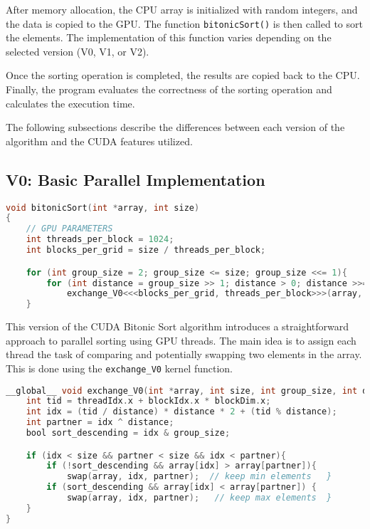 \documentclass[a4paper,12pt]{article}
\begin{document}
After memory allocation, the CPU array is initialized with random integers, and the data is copied to the GPU. The function \texttt{bitonicSort()} is then called to sort the elements. The implementation of this function varies depending on the selected version (V0, V1, or V2). 

Once the sorting operation is completed, the results are copied back to the CPU. Finally, the program evaluates the correctness of the sorting operation and calculates the execution time.

The following subsections describe the differences between each version of the algorithm and the CUDA features utilized.

\subsection{V0: Basic Parallel Implementation}

\begin{lstlisting}[language=C]
void bitonicSort(int *array, int size)
{
    // GPU PARAMETERS
    int threads_per_block = 1024;  
    int blocks_per_grid = size / threads_per_block; 

    for (int group_size = 2; group_size <= size; group_size <<= 1){ 
        for (int distance = group_size >> 1; distance > 0; distance >>= 1)
            exchange_V0<<<blocks_per_grid, threads_per_block>>>(array, size, group_size, distance);}
    }
\end{lstlisting}

This version of the CUDA Bitonic Sort algorithm introduces a straightforward approach to parallel sorting using GPU threads. The main idea is to assign each thread the task of comparing and potentially swapping two elements in the array. This is done using the \texttt{exchange\_V0} kernel function.

\begin{lstlisting}[language=C]
    __global__ void exchange_V0(int *array, int size, int group_size, int distance) {
    int tid = threadIdx.x + blockIdx.x * blockDim.x;
    int idx = (tid / distance) * distance * 2 + (tid % distance);
    int partner = idx ^ distance;
    bool sort_descending = idx & group_size;

    if (idx < size && partner < size && idx < partner){ 
        if (!sort_descending && array[idx] > array[partner]){
            swap(array, idx, partner);  // keep min elements   }
        if (sort_descending && array[idx] < array[partner]) {
            swap(array, idx, partner);   // keep max elements  }
    }
}
\end{lstlisting}
\end{document}
